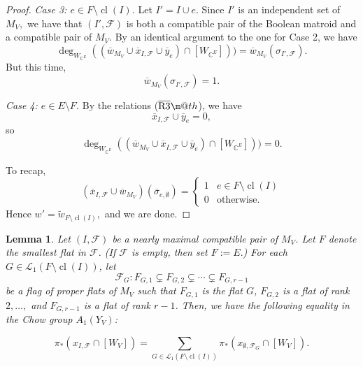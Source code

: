 \documentclass{amsart}
\makeatletter
\theoremstyle{plain}
\newtheorem{lemma}[theorem]{Lemma}
\theoremstyle{definition}
\newcommand{\cl}{\operatorname{cl}}
\newcommand*{\textoverline}[1]{$\overline{\hbox{#1}}\m@th$}
\makeatother
\begin{document}
\begin{proof}
\noindent
\textit{Case 3: $e \in F \setminus \cl(I)$.}
Let $I' = I \cup e.$ Since $I'$ is an independent set of $M_V,$ we have that $(I', \mathscr{F})$ is both a compatible pair of the Boolean matroid and a compatible pair of $M_V.$ By an identical argument to the one for Case 2, we have
\[\deg_{W_{\mathbb{C}^E}}((\overline{w}_{M_V} \cup \overline{x}_{I, \mathscr{F}} \cup \overline{y}_e)\cap [W_{\mathbb{C}^E}])) = \overline{w}_{M_V}(\sigma_{I', \mathscr{F}}).\]
But this time,
\[\overline{w}_{M_V}(\sigma_{I', \mathscr{F}}) = 1.\]

\noindent
\textit{Case 4: $e \in E \setminus F$.} By the relations (\textoverline{R3}), we have
\[\overline{x}_{I, \mathscr{F}} \cup \overline{y}_e =  0,\]
so
\[\deg_{W_{\mathbb{C}^E}}((\overline{w}_{M_V} \cup \overline{x}_{I, \mathscr{F}} \cup \overline{y}_e)\cap [W_{\mathbb{C}^E}])) = 0.\]

To recap,
\begin{equation*}
(\overline{x}_{I, \mathscr{F}} \cup \overline{w}_{M_V})(\overline{\sigma}_{e,\emptyset}) =
\begin{cases}
    1 & e \in F \setminus \cl(I) \\
    0 & \text{otherwise}.
\end{cases}
\end{equation*}
Hence $w' = \tilde{w}_{F \setminus \cl(I)},$ and we are done.
\end{proof}

\begin{lemma}
\label{lem:pushforward_equality}
Let $(I, \mathscr{F})$ be a nearly maximal compatible pair of $M_V$. Let $F$ denote the smallest flat in $\mathscr{F}$. (If $\mathscr{F}$ is empty, then set $F := E.$) For each $G \in \mathcal{L}_1(F \setminus \cl(I))$, let
\[\mathscr{F}_G:F_{G,1} \subsetneq F_{G,2} \subsetneq \cdots \subsetneq F_{G,r-1}\]
be a flag of proper flats of $M_V$ such that $F_{G,1}$ is the flat $G$, $F_{G,2}$ is a flat of rank $2,\ldots,$ and $F_{G,r-1}$ is a flat of rank $r-1$. Then, we have the following equality in the Chow group $A_1(Y_V)$:

\[\pi_*(x_{I,\mathscr{F}} \cap [W_V])=\sum_{G \in \mathcal{L}_1(F \setminus \cl(I))}\pi_*\left(x_{\emptyset, \mathscr{F}_G} \cap [W_V] \right).\]
\end{lemma}
\end{document}
